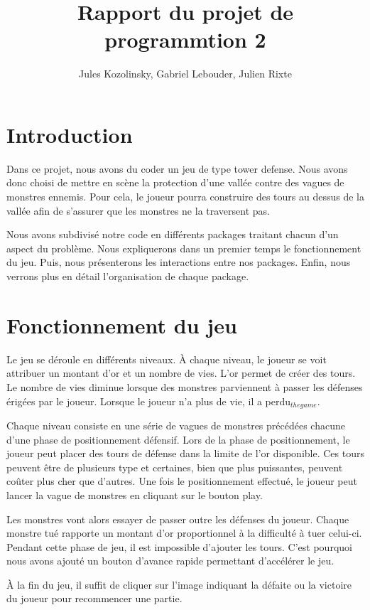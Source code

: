 \documentclass{article}
\title{Rapport du projet de programmtion 2}
\author{Jules Kozolinsky, Gabriel Lebouder, Julien Rixte}
\begin{document}
\maketitle

\section{Introduction}
Dans ce projet, nous avons du coder un jeu de type tower defense. Nous avons donc choisi de mettre en scène la protection d'une vallée contre des vagues de monstres ennemis. Pour cela, le joueur pourra construire des tours au dessus de la vallée afin de s'assurer que les monstres ne la traversent pas. 
\par
Nous avons subdivisé notre code en différents packages traitant chacun d'un aspect du problème. Nous expliquerons dans un premier temps le fonctionnement du jeu. Puis, nous présenterons les interactions entre nos packages. Enfin, nous verrons plus en détail l'organisation de chaque package.

\section{Fonctionnement du jeu}
Le jeu se déroule en différents niveaux. À chaque niveau, le joueur se voit attribuer un montant d'or et un nombre de vies. L'or permet de créer des tours. Le nombre de vies diminue lorsque des monstres parviennent à passer les défenses érigées par le joueur. Lorsque le joueur n'a plus de vie, il a perdu$_{the game}$.
\par
Chaque niveau consiste en une série de vagues de monstres précédées chacune d'une phase de positionnement défensif. Lors de la phase de positionnement, le joueur peut placer des tours de défense dans la limite de l'or disponible. Ces tours peuvent être de plusieurs type et certaines, bien que plus puissantes, peuvent coûter plus cher que d'autres. Une fois le positionnement effectué, le joueur peut lancer la vague de monstres en cliquant sur le bouton play.
\par
Les monstres vont alors essayer de passer outre les défenses du joueur. Chaque monstre tué rapporte un montant d'or proportionnel à la difficulté à tuer celui-ci. Pendant cette phase de jeu, il est impossible d'ajouter les tours. C'est pourquoi nous avons ajouté un bouton d'avance rapide permettant d'accélérer le jeu.
\par
À la fin du jeu, il suffit de cliquer sur l'image indiquant la défaite ou la victoire du joueur pour recommencer une partie.
\end{document}
